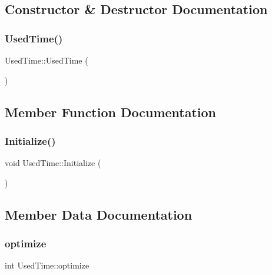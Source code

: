 \subsection{Constructor \& Destructor Documentation}
\mbox{\label{structUsedTime_a8cf394c31ea00d9005586318e7b5102f}} 
\subsubsection{\texorpdfstring{Used\+Time()}{UsedTime()}}
{\footnotesize\ttfamily Used\+Time\+::\+Used\+Time (\begin{DoxyParamCaption}{ }\end{DoxyParamCaption})\hspace{0.3cm}{\ttfamily [inline]}}



\subsection{Member Function Documentation}
\mbox{\label{structUsedTime_aacf9a820cf38fee8a04bc6b353305f72}} 
\subsubsection{\texorpdfstring{Initialize()}{Initialize()}}
{\footnotesize\ttfamily void Used\+Time\+::\+Initialize (\begin{DoxyParamCaption}{ }\end{DoxyParamCaption})\hspace{0.3cm}{\ttfamily [inline]}}



\subsection{Member Data Documentation}
\mbox{\label{structUsedTime_a6a7fe5130ec78b4e47238a50da127954}} 
\subsubsection{\texorpdfstring{optimize}{optimize}}
{\footnotesize\ttfamily int Used\+Time\+::optimize}



